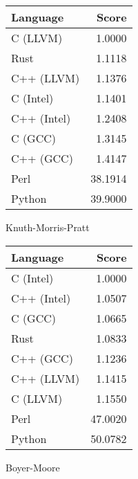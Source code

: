 \begin{subtable}{0.33\textwidth}
    \centering
    \begin{tabular}{|l|r|}
        \hline
        Language & Score \\
        \hline
        C (LLVM) & 1.0000 \\
        Rust & 1.1118 \\
        C++ (LLVM) & 1.1376 \\
        C (Intel) & 1.1401 \\
        C++ (Intel) & 1.2408 \\
        C (GCC) & 1.3145 \\
        C++ (GCC) & 1.4147 \\
        Perl & 38.1914 \\
        Python & 39.9000 \\
        \hline
    \end{tabular}
    \caption{Knuth-Morris-Pratt}
    \label{table:runtime:kmp}
\end{subtable}%
\begin{subtable}{0.33\textwidth}
    \centering
    \begin{tabular}{|l|r|}
        \hline
        Language & Score \\
        \hline
        C (Intel) & 1.0000 \\
        C++ (Intel) & 1.0507 \\
        C (GCC) & 1.0665 \\
        Rust & 1.0833 \\
        C++ (GCC) & 1.1236 \\
        C++ (LLVM) & 1.1415 \\
        C (LLVM) & 1.1550 \\
        Perl & 47.0020 \\
        Python & 50.0782 \\
        \hline
    \end{tabular}
    \caption{Boyer-Moore}
    \label{table:runtime:boyer_moore}
\end{subtable}%
